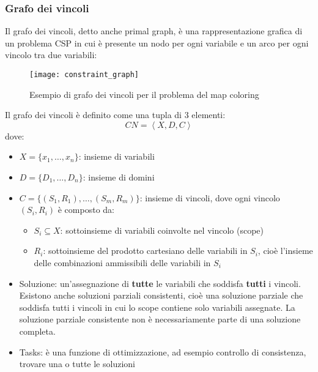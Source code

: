 \documentclass[a4paper]{article}
\begin{document}
\subsubsection{Grafo dei vincoli}
Il grafo dei vincoli, detto anche primal graph, è una rappresentazione grafica
di un problema CSP in cui è presente un nodo per ogni variabile e un arco per ogni
vincolo tra due variabili:
\begin{figure}[H]
  \centering
  \texttt{[image: constraint\_graph]}
  \caption{Esempio di grafo dei vincoli per il problema del map coloring}
\end{figure}

\begin{definition}
  Il grafo dei vincoli è definito come una tupla di 3 elementi:
  \[
    CN = \left< X, D, C \right>
  \] 
  dove:
  \begin{itemize}
    \item \( X = \{x_1, \ldots, x_n\}  \): insieme di variabili
    \item \( D = \{D_1, \ldots, D_n\}  \): insieme di domini
    \item \( C = \{(S_1, R_1), \ldots, (S_m, R_m)\}  \): insieme di vincoli, dove ogni vincolo
      \( (S_i, R_i) \) è composto da:
      \begin{itemize}
        \item \( S_i \subseteq X \): sottoinsieme di variabili coinvolte nel vincolo (scope)
        \item \( R_i \): sottoinsieme del prodotto cartesiano delle variabili in \( S_i \),
          cioè l'insieme delle combinazioni ammissibili delle variabili in \( S_i \)
      \end{itemize}
    \item Soluzione: un'assegnazione di \textbf{tutte} le variabili che soddisfa
      \textbf{tutti} i vincoli. Esistono anche soluzioni parziali consistenti, cioè
        una soluzione parziale che soddisfa tutti i vincoli in cui lo scope contiene
        solo variabili assegnate. La soluzione parziale consistente non è necessariamente
        parte di una soluzione completa.
    \item Tasks: è una funzione di ottimizzazione, ad esempio controllo di consistenza,
      trovare una o tutte le soluzioni
  \end{itemize}
\end{definition}
\end{document}

